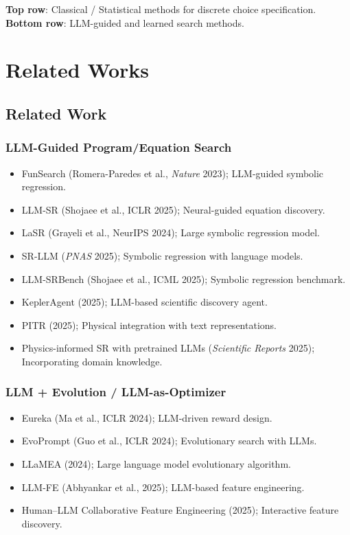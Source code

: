 \documentclass[11pt,a4paper]{article}
\begin{document}
\small
\textbf{Top row}: Classical / Statistical methods for discrete choice specification.
\textbf{Bottom row}: LLM-guided and learned search methods.
\normalsize

\section{Related Works}
\label{sec:related}

\subsection{Related Work}

\subsubsection{LLM-Guided Program/Equation Search}
\begin{itemize}
\item FunSearch (Romera-Paredes et al., \emph{Nature} 2023); LLM-guided symbolic regression.
\item LLM-SR (Shojaee et al., ICLR 2025); Neural-guided equation discovery.
\item LaSR (Grayeli et al., NeurIPS 2024); Large symbolic regression model.
\item SR-LLM (\emph{PNAS} 2025); Symbolic regression with language models.
\item LLM-SRBench (Shojaee et al., ICML 2025); Symbolic regression benchmark.
\item KeplerAgent (2025); LLM-based scientific discovery agent.
\item PITR (2025); Physical integration with text representations.
\item Physics-informed SR with pretrained LLMs (\emph{Scientific Reports} 2025); Incorporating domain knowledge.
\end{itemize}

\subsubsection{LLM + Evolution / LLM-as-Optimizer}
\begin{itemize}
\item Eureka (Ma et al., ICLR 2024); LLM-driven reward design.
\item EvoPrompt (Guo et al., ICLR 2024); Evolutionary search with LLMs.
\item LLaMEA (2024); Large language model evolutionary algorithm.
\item LLM-FE (Abhyankar et al., 2025); LLM-based feature engineering.
\item Human--LLM Collaborative Feature Engineering (2025); Interactive feature discovery.
\end{itemize}
\end{document}
